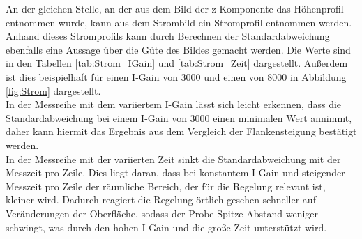 \documentclass[12pt,a4paper]{article}
\begin{document}
An der gleichen Stelle, an der aus dem Bild der z-Komponente das Höhenprofil entnommen wurde, kann aus dem Strombild ein Stromprofil entnommen werden. Anhand dieses Stromprofils kann durch Berechnen der Standardabweichung ebenfalls eine Aussage über die Güte des Bildes gemacht werden. Die Werte sind in den Tabellen \ref{tab:Strom_IGain} und \ref{tab:Strom_Zeit} dargestellt. Außerdem ist dies beispielhaft für einen I-Gain von 3000 und einen von 8000 in Abbildung \ref{fig:Strom} dargestellt.\\
In der Messreihe mit dem variiertem I-Gain lässt sich leicht erkennen, dass die Standardabweichung bei einem I-Gain von 3000 einen minimalen Wert annimmt, daher kann hiermit das Ergebnis aus dem Vergleich der Flankensteigung bestätigt werden.\\
In der Messreihe mit der variierten Zeit sinkt die Standardabweichung mit der Messzeit pro Zeile. Dies liegt daran, dass bei konstantem I-Gain und steigender Messzeit pro Zeile der räumliche Bereich, der für die Regelung relevant ist, kleiner wird. Dadurch reagiert die Regelung örtlich gesehen schneller auf Veränderungen der Oberfläche, sodass der Probe-Spitze-Abstand weniger schwingt, was durch den hohen I-Gain und die große Zeit unterstützt wird.
\end{document}
